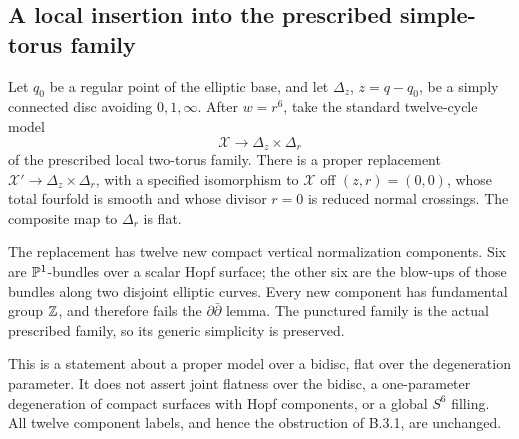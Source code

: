 \subsection{A local insertion into the prescribed simple-torus family}

\begin{proposition}[B.4.15; Proved]\label{push:B415}
Let $q_0$ be a regular point of the elliptic base, and let
$\Delta_z$, $z=q-q_0$, be a simply connected disc avoiding
$0,1,\infty$. After $w=r^6$, take the standard twelve-cycle
model
\[
 \mathcal X\longrightarrow\Delta_z\times\Delta_r
\]
of the prescribed local two-torus family. There is a proper
replacement $\mathcal X'\to\Delta_z\times\Delta_r$, with
a specified isomorphism to $\mathcal X$ off $(z,r)=(0,0)$,
whose total fourfold is smooth and whose divisor $r=0$ is
reduced normal crossings. The composite map to $\Delta_r$
is flat.

The replacement has twelve new compact vertical normalization
components. Six are $\mathbb P^1$-bundles over a scalar Hopf
surface; the other six are the blow-ups of those bundles
along two disjoint elliptic curves. Every new component
has fundamental group $\mathbb Z$, and therefore fails the
$\partial\bar\partial$ lemma. The punctured family is the
actual prescribed family, so its generic simplicity is
preserved.

This is a statement about a proper model over a bidisc,
flat over the degeneration parameter. It does not assert
joint flatness over the bidisc, a one-parameter degeneration
of compact surfaces with Hopf components, or a global
$S^6$ filling. All twelve component labels, and hence the
obstruction of B.3.1, are unchanged.
\end{proposition}

